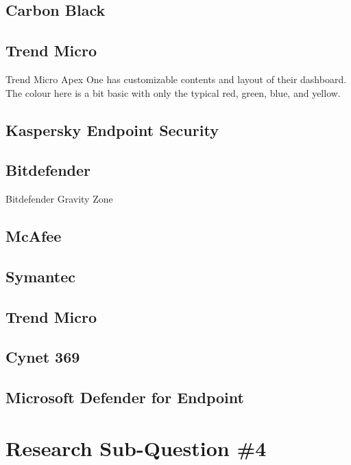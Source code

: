 \begin{multicols}{2}
      \subsection{Carbon Black}
      \subsection{Trend Micro} %
      Trend Micro Apex One has customizable contents and layout of their dashboard. The colour here is a bit basic with only the typical
      red, green, blue, and yellow.
      \subsection{Kaspersky Endpoint Security}
      \subsection{Bitdefender}
      Bitdefender Gravity Zone
      \subsection{McAfee}
      \subsection{Symantec}
      \subsection{Trend Micro}
      \subsection{Cynet 369}
      \subsection{Microsoft Defender for Endpoint}
      \section{Research Sub-Question \#4}
\end{multicols}